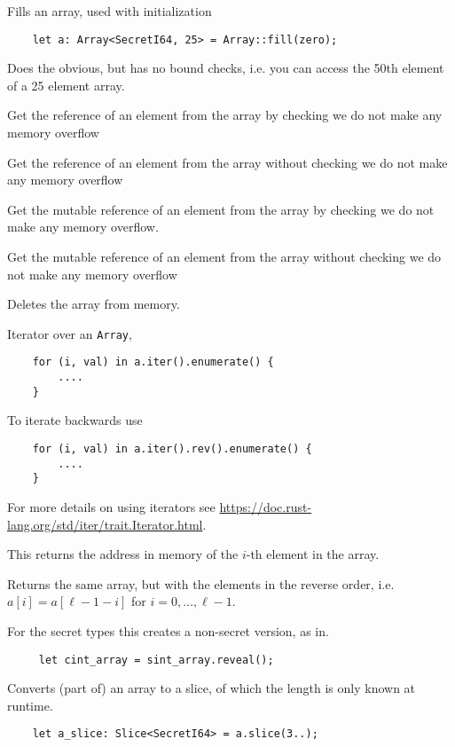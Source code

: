 Fills an array, used with initialization
\begin{lstlisting}
    let a: Array<SecretI64, 25> = Array::fill(zero);
\end{lstlisting}


Does the obvious, but has no bound checks, i.e. you can access the 50th element of a 25 element array.

Get the reference of an element from the array by checking we do not make any memory overflow

Get the reference of an element from the array without checking we do not make any memory overflow

Get the mutable reference of an element from the array by checking we do not make any memory overflow.

Get the mutable reference of an element from the array without checking we do not make any memory overflow

Deletes the array from memory.


Iterator over an \verb|Array|,
\begin{lstlisting}
    for (i, val) in a.iter().enumerate() {
        ....
    }
\end{lstlisting}
To iterate backwards use
\begin{lstlisting}
    for (i, val) in a.iter().rev().enumerate() {
        ....
    }
\end{lstlisting}
For more details on using iterators see \url{https://doc.rust-lang.org/std/iter/trait.Iterator.html}.

This returns the address in memory of the $i$-th element in the array.

Returns the same array, but with the elements in the reverse order, i.e.
$a[i] = a[\ell-1-i]$ for $i=0,\ldots,\ell-1$.

For the secret types this creates a non-secret version, as in.
\begin{lstlisting}
     let cint_array = sint_array.reveal();
\end{lstlisting}

Converts (part of) an array to a slice, of which the length is only known at runtime.
\begin{lstlisting}
    let a_slice: Slice<SecretI64> = a.slice(3..);
\end{lstlisting}

